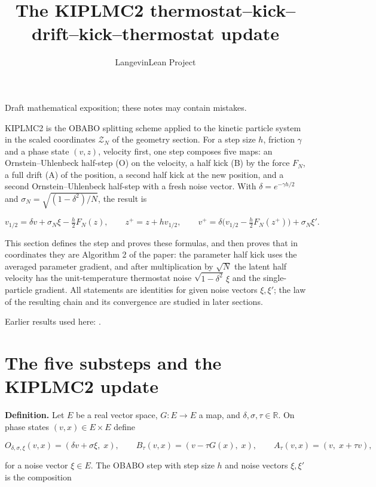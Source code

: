 \documentclass[11pt,a4paper]{article}
\title{\texorpdfstring{The KIPLMC2 thermostat–kick–drift–kick–thermostat update}{The KIPLMC2 thermostat–kick–drift–kick–thermostat update}}
\author{LangevinLean Project}
\date{}
\begin{document}
\maketitle
Draft mathematical exposition; these notes may contain mistakes.


KIPLMC2 is the OBABO splitting scheme applied to the kinetic particle system in the scaled coordinates \(\mathcal Z_N\) of the geometry section. For a step size \(h\), friction \(\gamma\) and a phase state \((v,z)\), velocity first, one step composes five maps: an Ornstein–Uhlenbeck half-step (O) on the velocity, a half kick (B) by the force \(F_N\), a full drift (A) of the position, a second half kick at the new position, and a second Ornstein–Uhlenbeck half-step with a fresh noise vector. With \(\delta=e^{-\gamma h/2}\) and \(\sigma_N=\sqrt{(1-\delta^2)/N}\), the result is


\[v_{1/2}=\delta v+\sigma_N\xi-\tfrac h2F_N(z),\qquad z^+=z+hv_{1/2},\qquad v^+=\delta\bigl(v_{1/2}-\tfrac h2F_N(z^+)\bigr)+\sigma_N\xi'.\]


This section defines the step and proves these formulas, and then proves that in coordinates they are Algorithm 2 of the paper: the parameter half kick uses the averaged parameter gradient, and after multiplication by \(\sqrt N\) the latent half velocity has the unit-temperature thermostat noise \(\sqrt{1-\delta^2}\,\xi\) and the single-particle gradient. All statements are identities for given noise vectors \(\xi,\xi'\); the law of the resulting chain and its convergence are studied in later sections.



Earlier results used here: \cite[Section~3.20]{LangevinLean2026Kinetic}.

\section{\texorpdfstring{The five substeps and the KIPLMC2 update}{The five substeps and the KIPLMC2 update}}


\textbf{Definition.} Let \(E\) be a real vector space, \(G:E\to E\) a map, and \(\delta,\sigma,\tau\in\mathbb R\). On phase states \((v,x)\in E\times E\) define


\[O_{\delta,\sigma,\xi}(v,x)=(\delta v+\sigma\xi,\;x),\qquad B_\tau(v,x)=(v-\tau G(x),\;x),\qquad A_\tau(v,x)=(v,\;x+\tau v),\]


for a noise vector \(\xi\in E\). The OBABO step with step size \(h\) and noise vectors \(\xi,\xi'\) is the composition
\end{document}
